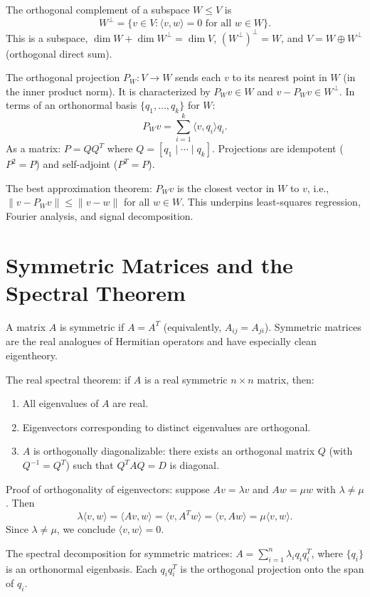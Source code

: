 \documentclass[11pt]{article}
\begin{document}
The orthogonal complement of a subspace $W \leq V$ is
\[
W^\perp = \{v \in V : \langle v, w \rangle = 0 \text{ for all } w \in W\}.
\]
This is a subspace, $\dim W + \dim W^\perp = \dim V$, $(W^\perp)^\perp = W$, and $V = W \oplus W^\perp$ (orthogonal direct sum).

The orthogonal projection $P_W: V \to W$ sends each $v$ to its nearest point in $W$ (in the inner product norm). It is characterized by $P_W v \in W$ and $v - P_W v \in W^\perp$. In terms of an orthonormal basis $\{q_1, \ldots, q_k\}$ for $W$:
\[
P_W v = \sum_{i=1}^k \langle v, q_i \rangle q_i.
\]
As a matrix: $P = QQ^T$ where $Q = [q_1 \mid \cdots \mid q_k]$. Projections are idempotent ($P^2 = P$) and self-adjoint ($P^T = P$).

The best approximation theorem: $P_W v$ is the closest vector in $W$ to $v$, i.e., $\|v - P_W v\| \leq \|v - w\|$ for all $w \in W$. This underpins least-squares regression, Fourier analysis, and signal decomposition.

\section*{Symmetric Matrices and the Spectral Theorem}

A matrix $A$ is symmetric if $A = A^T$ (equivalently, $A_{ij} = A_{ji}$). Symmetric matrices are the real analogues of Hermitian operators and have especially clean eigentheory.

The real spectral theorem: if $A$ is a real symmetric $n \times n$ matrix, then:
\begin{enumerate}
  \item All eigenvalues of $A$ are real.
  \item Eigenvectors corresponding to distinct eigenvalues are orthogonal.
  \item $A$ is orthogonally diagonalizable: there exists an orthogonal matrix $Q$ (with $Q^{-1} = Q^T$) such that $Q^T A Q = D$ is diagonal.
\end{enumerate}

Proof of orthogonality of eigenvectors: suppose $Av = \lambda v$ and $Aw = \mu w$ with $\lambda \neq \mu$. Then
\[
\lambda \langle v, w \rangle = \langle Av, w \rangle = \langle v, A^T w \rangle = \langle v, Aw \rangle = \mu \langle v, w \rangle.
\]
Since $\lambda \neq \mu$, we conclude $\langle v, w \rangle = 0$.

The spectral decomposition for symmetric matrices: $A = \sum_{i=1}^n \lambda_i q_i q_i^T$, where $\{q_i\}$ is an orthonormal eigenbasis. Each $q_i q_i^T$ is the orthogonal projection onto the span of $q_i$.
\end{document}
